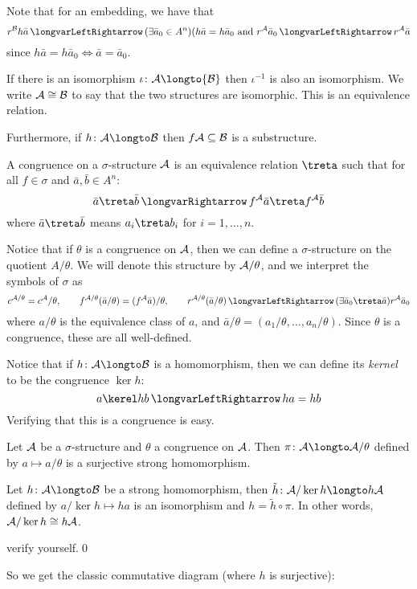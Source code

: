 \edefn

Note that for an embedding, we have that
$$ r^{\cal B}h\bar a \iff (\exists\bar a_0\in A^n)(h\bar a=h\bar a_0\hbox{ and }r^{\cal A}\bar a_0
\iff r^{\cal A}\bar a $$
since $h\bar a=h\bar a_0\iff\bar a=\bar a_0$.

If there is an isomorphism $\iota\colon{\cal A}\longto{\cal B}$ then $\iota^{-1}$ is also an
isomorphism.
We write ${\cal A}\cong{\cal B}$ to say that the two structures are isomorphic.
This is an equivalence relation.

Furthermore, if $h\colon\c A\longto\c B$ then $f{\cal A}\subseteq{\cal B}$ is a substructure.

\bdefn

    A {\emphcolor congruence} on a $\sigma$-structure ${\cal A}$ is an equivalence relation
    $\treta$ such that for all $f\in\sigma$ and $\bar a,\bar b\in A^n$:
    $$ \bar a\treta\bar b \implies f^{\cal A}\bar a\treta f^{\cal A}\bar b $$
    where $\bar a\treta\bar b$ means $a_i\treta b_i$ for $i=1,\dots,n$.

\edefn

Notice that if $\theta$ is a congruence on ${\cal A}$, then we can define a $\sigma$-structure
on the quotient $A/\theta$.
We will denote this structure by ${\cal A}/\theta$, and we interpret the symbols of $\sigma$ as
$$ c^{\c A/\theta} = c^{\c A}/\theta,\qquad
f^{\c A/\theta}(\bar a/\theta) = (f^{\c A}\bar a)/\theta,\qquad
r^{\c A/\theta}(\bar a/\theta) \iff (\exists\bar a_0\treta\bar a)r^{\c A}\bar a_0 $$
where $a/\theta$ is the equivalence class of $a$, and
$\bar a/\theta=(a_1/\theta,\dots,a_n/\theta)$.
Since $\theta$ is a congruence, these are all well-defined.

Notice that if $h\colon\c A\longto\c B$ is a homomorphism, then we can define its {\it kernel}
to be the congruence $\ker h$:
$$ a\kerel hb \iff ha=hb $$
Verifying that this is a congruence is easy.

\bthrm[title=The First Isomorphism Theorem]

    \benum
        \item Let ${\cal A}$ be a $\sigma$-structure and $\theta$ a congruence on ${\cal A}$.
        Then $\pi\colon\c A\longto\c A/\theta$ defined by $a\mapsto a/\theta$ is a surjective
        strong homomorphism.
        \item Let $h\colon\c A\longto\c B$ be a strong homomorphism, then
        $\tilde h\colon\c A/\ker h\longto h\c A$ defined by $a/\ker h\mapsto ha$ is an
        isomorphism and $h=\tilde h\circ\pi$.
        In other words, ${\cal A}/\ker h\cong h{\cal A}$.
    \eenum

\ethrm

\Proof verify yourself.\qed

So we get the classic commutative diagram (where $h$ is surjective):

\bigskip
\centerline{
\def\diagrowbuf{1cm}
\def\diagcolbuf{1cm}
}
\bigskip


